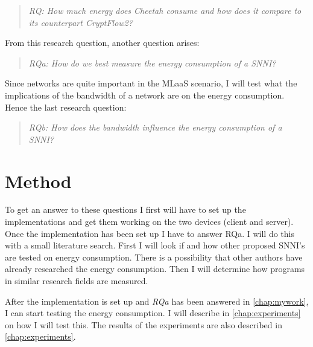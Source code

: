 \documentclass[../thesis.tex]{subfiles}
\begin{document}
\begin{quote} \emph{RQ: How much energy does Cheetah consume and how does it compare to its counterpart CryptFlow2?} \end{quote} 

\noindent From this research question, another question arises:

\begin{quote} \emph{RQa: How do we best measure the energy consumption of a SNNI?} \end{quote}

\noindent Since networks are quite important in the MLaaS scenario, I will test what the implications of the bandwidth of a network are on the energy consumption. Hence the last research question:

\begin{quote}
    \emph{RQb: How does the bandwidth influence the energy consumption of a SNNI?}
\end{quote}


\section{Method}
To get an answer to these questions I first will have to set up the implementations and get them working on the two devices (client and server). Once the implementation has been set up I have to answer RQa. I will do this with a small literature search. First I will look if and how other proposed SNNI's are tested on energy consumption. There is a possibility that other authors have already researched the energy consumption. Then I will determine how programs in similar research fields are measured.

After the implementation is set up and \textit{RQa} has been answered in \autoref{chap:mywork}, I can start testing the energy consumption. I will describe in \autoref{chap:experiments} on how I will test this. The results of the experiments are also described in \autoref{chap:experiments}.
\end{document}
